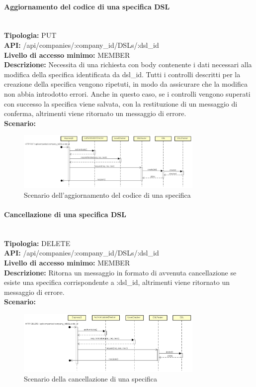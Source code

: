 \newpage
\paragraph{Aggiornamento del codice di una specifica DSL}\mbox{}\\
\textbf{Tipologia:} PUT \\
\textbf{API:} /api/companies/:company\_id/DSLs/:dsl\_id \\
\textbf{Livello di accesso minimo:} MEMBER \\
\textbf{Descrizione:} Necessita di una richiesta con body contenente i dati necessari alla modifica della specifica  identificata da dsl\_id. Tutti i controlli descritti per la creazione della specifica  vengono ripetuti, in modo da assicurare che la modifica non abbia introdotto errori. Anche in questo caso, se i controlli vengono superati con successo la specifica  viene salvata, con la restituzione di un messaggio di conferma, altrimenti viene ritornato un messaggio di errore. \\
\textbf{Scenario:}
\begin{figure}[H]
\centering
\includegraphics[width=0.8\textwidth]{res/sections/backend/sequence/(PUT)dsl.png}
\caption{Scenario dell'aggiornamento del codice di una specifica }
\end{figure}

\newpage
\paragraph{Cancellazione di una specifica DSL}\mbox{}\\
\textbf{Tipologia:} DELETE \\
\textbf{API:} /api/companies/:company\_id/DSLs/:dsl\_id \\
\textbf{Livello di accesso minimo:} MEMBER \\
\textbf{Descrizione:} Ritorna un messaggio in formato  di avvenuta cancellazione se esiste una specifica  corrispondente a :dsl\_id, altrimenti viene ritornato un messaggio di errore. \\
\textbf{Scenario:} 
\begin{figure}[H]
\centering
\includegraphics[width=0.8\textwidth]{res/sections/backend/sequence/(DELETE)dsl.png}
\caption{Scenario della cancellazione di una specifica }
\end{figure}

